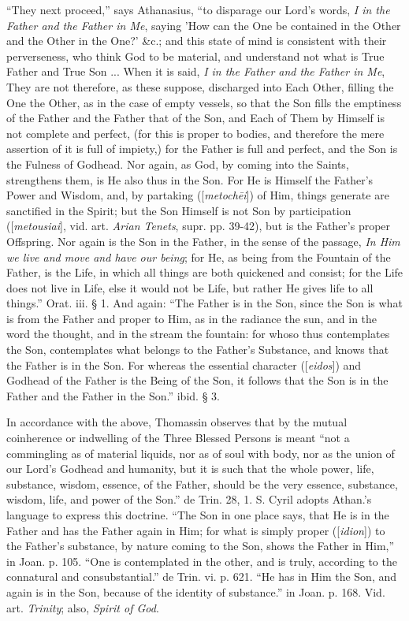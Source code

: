 ``They next proceed,'' says Athanasius, ``to
disparage our Lord's words, \emph{I in the Father and the Father in Me},
saying 'How can the One be contained in the Other and the
Other in the One?' \&c.; and this state of mind is consistent with
their perverseness, who think God to be material, and understand not
what is True Father and True Son ... When it is said, \emph{I in the
Father and the Father in Me},
They are not therefore, as these suppose, discharged into Each
Other, filling the One the Other, as in the case of empty vessels, so
that the Son fills the emptiness of the Father and the Father that of
the Son, and Each of Them by Himself is not complete and perfect, (for
this is proper to bodies, and therefore the mere assertion of it is
full of impiety,) for the Father is full and perfect, and the Son is
the Fulness of Godhead. Nor again, as God, by coming into the Saints,
strengthens them, is He also thus in the Son. For He is Himself the
Father's Power and Wisdom, and, by partaking ([\emph{metoch\={e}i}])
of Him, things generate are sanctified in the Spirit; but the Son
Himself is not Son by participation ([\emph{metousiai}], vid. art. \emph{Arian Tenets}, supr. pp. 39-42), but is the Father's proper Offspring. Nor
again is the Son in the Father, in the sense of the passage, \emph{In Him
we live and move and have our being};
for He, as being from the Fountain of the Father, is the Life,
in which all things are both quickened and consist; for the Life does
not live in Life, else it would not be Life, but rather He gives life
to all things.'' Orat. iii. § 1. And again: ``The Father is in the Son,
since the Son is what is from the Father and proper to Him, as in the
radiance the sun, and in the word the thought, and in the stream the
fountain: for whoso thus contemplates the Son, contemplates what
belongs to the Father's Substance, and knows that the Father is
in the Son. For whereas the essential character ([\emph{eidos}]) and
Godhead of the Father is the Being of the Son, it follows that the Son
is in the Father and the Father in the Son.'' ibid. § 3.

In accordance with the above, Thomassin observes
that by the mutual coinherence or indwelling of the Three Blessed
Persons is meant ``not a commingling as of material liquids, nor as of
soul with body, nor as the union of our Lord's Godhead and humanity,
but it is such that the whole power, life, substance, wisdom, essence,
of the Father, should be the very essence, substance, wisdom, life,
and power of the Son.'' de Trin. 28, 1. S. Cyril adopts Athan.'s
language to express this doctrine. ``The Son in one place says, that He
is in the Father and has the Father again in Him; for what is simply
proper ([\emph{idion}]) to the Father's substance, by nature coming to
the Son, shows the Father in Him,'' in Joan. p. 105. ``One is
contemplated in the other, and is truly, according to the connatural
and consubstantial.'' de Trin. vi. p. 621. ``He has in Him the Son, and
again is in the Son, because of the identity of substance.'' in Joan.
p. 168. Vid. art. \emph{Trinity}; also, \emph{Spirit of God}.

